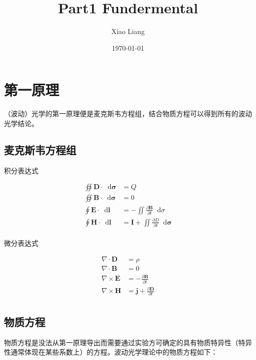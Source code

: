 \documentclass[UTF8]{ctexart}
\title{Part1 Fundermental}
\author{Xiao Liang}
\date{\today}
\newcommand*{\dif}{\mathop{}\!\mathrm{d}}
\begin{document}
	\maketitle
	\tableofcontents
	\newpage
	
	\section{第一原理}
	（波动）光学的第一原理便是麦克斯韦方程组，结合物质方程可以得到所有的波动光学结论。
	
	\subsection{麦克斯韦方程组}
	
\noindent 积分表达式

	\begin{equation}
	\begin{aligned}
	\oiint \boldsymbol{D} \cdot \dif \boldsymbol{\sigma}&=Q
	\\
	\oiint \boldsymbol{B} \cdot \dif \boldsymbol{\sigma}&=0
	\\
	\oint \boldsymbol{E} \cdot \dif \boldsymbol{l}&=-\iint \frac{\partial \boldsymbol{B}}{\partial t} \dif \sigma
	\\
	\oint \boldsymbol{H} \cdot \dif \boldsymbol{l}&=\boldsymbol{I}+\iint \frac{\partial D}{\partial t} \dif \boldsymbol{\sigma}
	\\
	\end{aligned}
	\end{equation}
	
\noindent 微分表达式

\begin{equation}
	\begin{aligned}
	\nabla \cdot \boldsymbol{D}&=\rho
	\\
	\nabla \cdot \boldsymbol{B}&=0
	\\
	\nabla \times \boldsymbol{E}&=-\frac{\partial \boldsymbol{B}}{\partial t}
	\\
	\nabla \times \boldsymbol{H}&=\boldsymbol{j}+\frac{\partial \boldsymbol{D}}{\partial t}
	\\
	\end{aligned}\label{equ_Maxwell}
\end{equation}

	\subsection{物质方程}
	物质方程是没法从第一原理导出而需要通过实验方可确定的具有物质特异性（特异性通常体现在某些系数上）的方程。波动光学理论中的物质方程如下：
	
\end{document}
